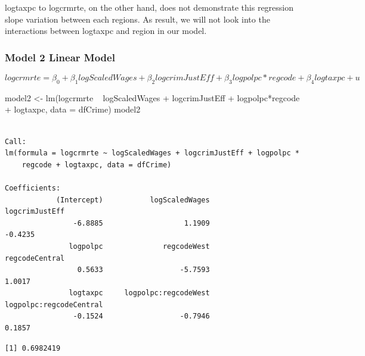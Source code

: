 \documentclass[]{article}
\newenvironment{Shaded}{}{}
\newcommand{\DataTypeTok}[1]{#1}
\newcommand{\KeywordTok}[1]{\textcolor[rgb]{0.00,0.00,1.00}{#1}}
\newcommand{\NormalTok}[1]{#1}
\newcommand{\OperatorTok}[1]{#1}
\newcommand{\StringTok}[1]{\textcolor[rgb]{0.00,0.50,0.50}{#1}}
\begin{document}
logtaxpc to logcrmrte, on the other hand, does not demonstrate this
regression slope variation between each regions. As result, we will not
look into the interactions between logtaxpc and region in our model.

\hypertarget{model-2-linear-model}{%
\subsubsection{Model 2 Linear Model}\label{model-2-linear-model}}

\[logcrmrte = \beta_0 + \beta_1logScaledWages + \beta_2logcrimJustEff + \beta_3logpolpc * regcode + \beta_4logtaxpc + u\]

\begin{Shaded}
\begin{Highlighting}[]
\NormalTok{model2 <-}\StringTok{ }\KeywordTok{lm}\NormalTok{(logcrmrte }\OperatorTok{~}\StringTok{ }\NormalTok{logScaledWages }\OperatorTok{+}\StringTok{ }\NormalTok{logcrimJustEff }\OperatorTok{+}\StringTok{ }\NormalTok{logpolpc}\OperatorTok{*}\NormalTok{regcode }\OperatorTok{+}\StringTok{ }\NormalTok{logtaxpc, }\DataTypeTok{data =}\NormalTok{ dfCrime)}
\NormalTok{model2}
\end{Highlighting}
\end{Shaded}

\begin{verbatim}

Call:
lm(formula = logcrmrte ~ logScaledWages + logcrimJustEff + logpolpc * 
    regcode + logtaxpc, data = dfCrime)

Coefficients:
            (Intercept)           logScaledWages           logcrimJustEff  
                -6.8885                   1.1909                  -0.4235  
               logpolpc              regcodeWest           regcodeCentral  
                 0.5633                  -5.7593                   1.0017  
               logtaxpc     logpolpc:regcodeWest  logpolpc:regcodeCentral  
                -0.1524                  -0.7946                   0.1857  
\end{verbatim}

\begin{Shaded}
\end{Shaded}

\begin{verbatim}
[1] 0.6982419
\end{verbatim}
\end{document}
